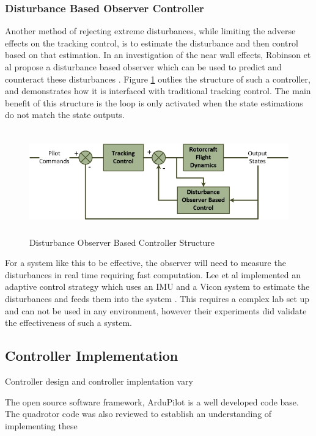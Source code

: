 			\subsubsection{Disturbance Based Observer Controller}\label{SectionDisturbanceObserver}
			Another method of rejecting extreme disturbances, while limiting the adverse effects on the tracking control, is to estimate the disturbance and then control based on that estimation. In an investigation of the near wall effects, Robinson et al propose a disturbance based observer which can be used to predict and counteract these disturbances \cite{NearWall, Robinson2016}. Figure \ref{IM_DOBC} outlies the structure of such a controller, and demonstrates how it is interfaced with traditional tracking control. The main benefit of this structure is the loop is only activated when the state estimations do not match the state outputs. 
			
			\begin{figure}[H]
				\centering
				\includegraphics[height = 4.5cm]{../References/Diagrams/DOBC}     
				\caption{Disturbance Observer Based Controller Structure}
				\label{IM_DOBC}
			\end{figure}
			
			For a system like this to be effective, the observer will need to measure the disturbances in real time requiring fast computation. Lee et al implemented an adaptive control strategy which uses an IMU and a Vicon system to estimate the disturbances and feeds them into the system \cite{Lee2012}. This requires a complex lab set up and can not be used in any environment, however their experiments did validate the effectiveness of such a system.

	\subsection{Controller Implementation}
	Controller design and controller implentation vary 
	
	The open source software framework, ArduPilot is a well developed code base. The quadrotor code was also reviewed to establish an understanding of implementing these 
	\cite{Meier2015}
	

